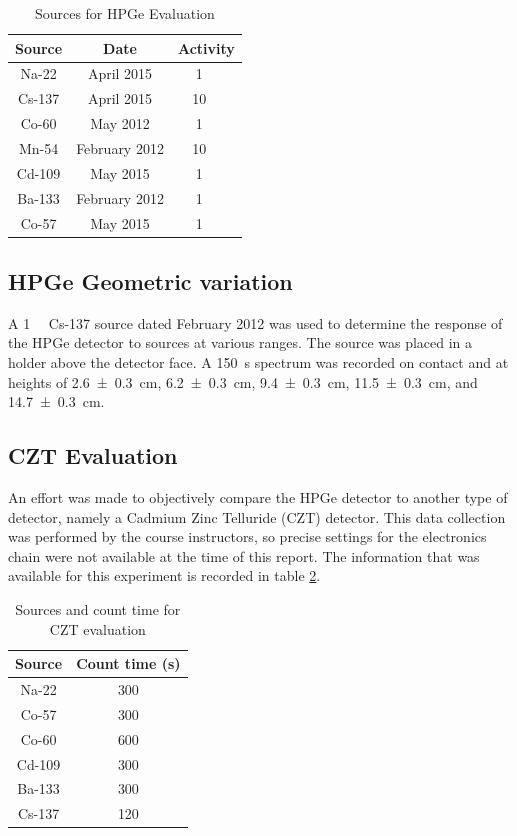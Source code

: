\documentclass[12pt]{article}
\begin{document}
\begin{center}
\begin{table}
	\centering
	\caption{Sources for HPGe Evaluation\label{tab:hpgesources}}
	\begin{tabular}{c c c}
		\hline\hline
		Source & Date & Activity \\
		\hline
		Na-22 & April 2015 & \SI{1}{\micro\curie} \\
		Cs-137 & April 2015 & \SI{10}{\micro\curie} \\
		Co-60 & May 2012 & \SI{1}{\micro\curie} \\
		Mn-54 & February 2012 & \SI{10}{\micro\curie} \\
		Cd-109 & May 2015 & \SI{1}{\micro\curie} \\
		Ba-133 & February 2012 & \SI{1}{\micro\curie} \\
		Co-57 & May 2015 & \SI{1}{\micro\curie} \\
		\hline
	\end{tabular}
\end{table}
\end{center}

\subsection{HPGe Geometric variation}
A \SI{1}{\micro\curie} Cs-137 source dated February 2012 was used to determine the response of the HPGe detector to sources at various ranges. The source was placed in a holder above the detector face. A \SI{150}{\second} spectrum was recorded on contact and at heights of \SI{2.6\pm.3}{\centi\meter}, \SI{6.2\pm.3}{\centi\meter}, \SI{9.4\pm.3}{\centi\meter}, \SI{11.5\pm.3}{\centi\meter}, and \SI{14.7\pm.3}{\centi\meter}.

\subsection{CZT Evaluation}
An effort was made to objectively compare the HPGe detector to another type of detector, namely a Cadmium Zinc Telluride (CZT) detector. This data collection was performed by the course instructors, so precise settings for the electronics chain were not available at the time of this report. The information that was available for this experiment is recorded in table \ref{tab:cztsources}.

\begin{center}
\begin{table}
	\centering
	\caption{Sources and count time for CZT evaluation\label{tab:cztsources}}
	\begin{tabular}{c c}
		\hline\hline
		Source & Count time (\si{\second}) \\
		\hline
		Na-22 & 300 \\
		Co-57 & 300 \\
		Co-60 & 600 \\ 
		Cd-109 & 300 \\
		Ba-133 & 300 \\
		Cs-137 & 120 \\
		\hline
	\end{tabular}
\end{table}
\end{center}
\end{document}
